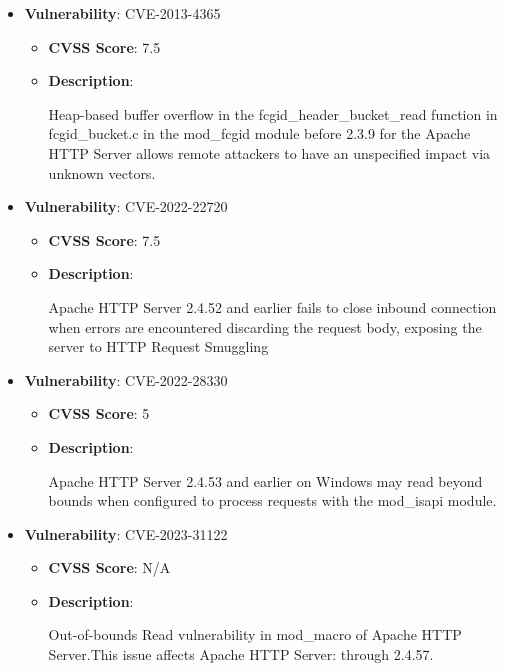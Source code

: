 \documentclass{article}
\begin{document}
\begin{itemize}
        \item \textbf{Vulnerability}: CVE-2013-4365
        \begin{itemize}
            \item \textbf{CVSS Score}:  7.5 
            \item \textbf{Description}:
            \parbox[t]{0.9\linewidth}{
                \ttfamily Heap-based buffer overflow in the fcgid\_header\_bucket\_read function in fcgid\_bucket.c in the mod\_fcgid module before 2.3.9 for the Apache HTTP Server allows remote attackers to have an unspecified impact via unknown vectors.
            }
        \end{itemize}
    
        \item \textbf{Vulnerability}: CVE-2022-22720
        \begin{itemize}
            \item \textbf{CVSS Score}:  7.5 
            \item \textbf{Description}:
            \parbox[t]{0.9\linewidth}{
                \ttfamily Apache HTTP Server 2.4.52 and earlier fails to close inbound connection when errors are encountered discarding the request body, exposing the server to HTTP Request Smuggling
            }
        \end{itemize}
    
        \item \textbf{Vulnerability}: CVE-2022-28330
        \begin{itemize}
            \item \textbf{CVSS Score}:  5 
            \item \textbf{Description}:
            \parbox[t]{0.9\linewidth}{
                \ttfamily Apache HTTP Server 2.4.53 and earlier on Windows may read beyond bounds when configured to process requests with the mod\_isapi module.
            }
        \end{itemize}
    
        \item \textbf{Vulnerability}: CVE-2023-31122
        \begin{itemize}
            \item \textbf{CVSS Score}:  N/A 
            \item \textbf{Description}:
            \parbox[t]{0.9\linewidth}{
                \ttfamily Out-of-bounds Read vulnerability in mod\_macro of Apache HTTP Server.This issue affects Apache HTTP Server: through 2.4.57.
            }
        \end{itemize}
    

\end{itemize}
\end{document}
